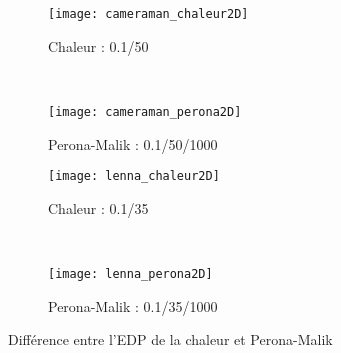 \documentclass[a4paper,12pt,twoside]{report}
\newcommand{\1}{\mathbb{1}}
\begin{document}
	\begin{figure}[htbp]
    \centering
    \begin{subfigure}[b]{0.45\textwidth}
        \centering \texttt{[image: cameraman\_chaleur2D]}
        \caption{Chaleur : 0.1/50}
    \end{subfigure}
    ~
    \begin{subfigure}[b]{0.45\textwidth}
        \centering \texttt{[image: cameraman\_perona2D]}
        \caption{Perona-Malik : 0.1/50/1000}
    \end{subfigure}
	
    \begin{subfigure}[b]{0.46\textwidth}
        \centering \texttt{[image: lenna\_chaleur2D]}
        \caption{Chaleur : 0.1/35}
    \end{subfigure}
    ~
    \begin{subfigure}[b]{0.45\textwidth}
        \centering \texttt{[image: lenna\_perona2D]}
        \caption{Perona-Malik : 0.1/35/1000}
    \end{subfigure}
    \caption{Différence entre l'EDP de la chaleur et Perona-Malik}
	\end{figure}


	
	
\end{document}
